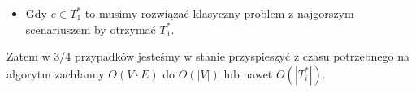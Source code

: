 \begin{itemize}
	\item Gdy $e \in T_{1}^{\ast}$ to musimy rozwiązać klasyczny problem z najgorszym scenariuszem by otrzymać $T_{1}^{\ast}$.
\end{itemize}

Zatem w 3/4 przypadków jesteśmy w stanie przyspieszyć z czasu potrzebnego na algorytm zachłanny $O \left( V \cdot E \right)$ do $O \left( \left| V \right| \right)$ lub nawet $O \left( \left| T_{i}^{\ast} \right| \right)$.

